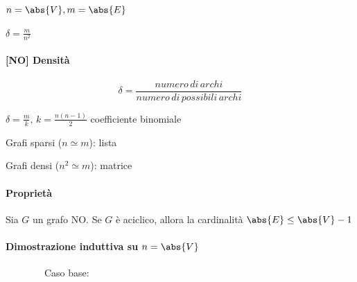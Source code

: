 $n=\abs{V},m=\abs{E}$

$\delta=\frac{m}{n^2}$

\paragraph{{[}NO{]} Densità}

\begin{equation}
\delta=\frac{numero\,di\,archi}{numero\,di\,possibili\,archi}
\end{equation}

{$\delta=\frac{m}{k},\,k = \frac{n(n-1)}{2}$ coefficiente binomiale}


{Grafi sparsi ($n\simeq m$): lista}

{Grafi densi ($n^2\simeq m$): matrice}

\paragraph{Proprietà}

{Sia $G$ un grafo NO. Se $G$ è aciclico, allora la cardinalità $\abs{E} \leq \abs{V}-1$}

\paragraph{ Dimostrazione induttiva su $n=\abs{V}$}

{~~~~~~~~Caso base:}

